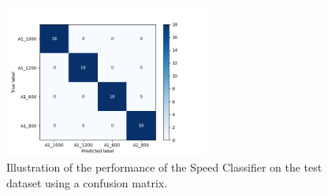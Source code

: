 \documentclass[
  manuscript=report,  %
  layout=preprint,  %
  year=20xx,
  volume=x,
]{extra/joas}
\begin{document}
\begin{figure}[ht!]
  \centering
  \includegraphics[width=0.6\textwidth]{figures/speedClassifierConfusionMatrix.png}
  \caption{Illustration of the performance of the Speed Classifier on the test dataset using a confusion matrix.}
  \label{fig:speedClassifierCM}
\end{figure}






%



\end{document}
